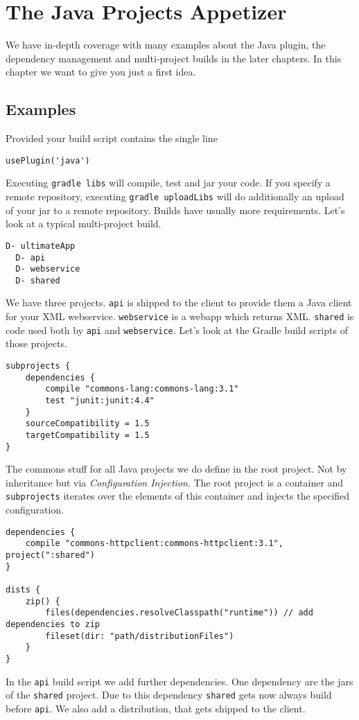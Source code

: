 \chapter{The Java Projects Appetizer} %
\label{cha:the_java_projects_tutorial}
We have in-depth coverage with many examples about the Java plugin, the dependency management and multi-project builds in the later chapters. In this chapter we want to give you just a first idea.

\section{Examples} %
\label{sec:examples}
Provided your build script contains the single line
\begin{Verbatim}
usePlugin('java')
\end{Verbatim}
Executing \texttt{gradle libs} will compile, test and jar your code. If you specify a remote repository, executing \texttt{gradle uploadLibs} will do additionally an upload of your jar to a remote repository. 
Builds have usually more requirements. Let's look at a typical multi-project build.

\begin{Verbatim}[frame=single,label=Project Tree]
D- ultimateApp
  D- api
  D- webservice
  D- shared 
\end{Verbatim}
We have three projects. \texttt{api} is shipped to the client to provide them a Java client for your XML webservice. \texttt{webservice} is a webapp which returns XML. \texttt{shared} is code used both by \texttt{api} and \texttt{webservice}. Let's look at the Gradle build scripts of those projects.

\begin{Verbatim}[frame=single,label=ultimateApp]
subprojects {
	dependencies {
		compile "commons-lang:commons-lang:3.1"
		test "junit:junit:4.4"
	}
	sourceCompatibility = 1.5
	targetCompatibility = 1.5
}
\end{Verbatim}
The commons stuff for all Java projects we do define in the root project. Not by inheritance but via \emph{Configuration Injection}. The root project is a container and \texttt{subprojects} iterates over the elements of this container and injects the specified configuration.

\begin{Verbatim}[frame=single,label=api]
dependencies {
	compile "commons-httpclient:commons-httpclient:3.1", project(":shared")
}

dists {
	zip() {
		files(dependencies.resolveClasspath("runtime")) // add dependencies to zip
		fileset(dir: "path/distributionFiles")
	}
}
\end{Verbatim}
In the \texttt{api} build script we add further dependencies. One dependency are the jars of the \texttt{shared} project. Due to this dependency \texttt{shared} gets now always build before \texttt{api}. We also add a distribution, that gets shipped to the client.



